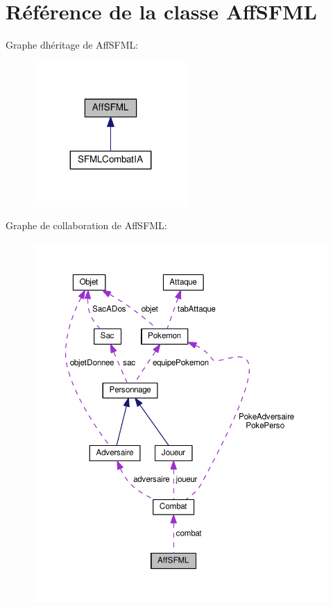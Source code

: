 \hypertarget{class_aff_s_f_m_l}{}\section{Référence de la classe Aff\+S\+F\+ML}
\label{class_aff_s_f_m_l}


Graphe d\textquotesingle{}héritage de Aff\+S\+F\+ML\+:\nopagebreak
\begin{figure}[H]
\begin{center}
\leavevmode
\includegraphics[width=167pt]{class_aff_s_f_m_l__inherit__graph}
\end{center}
\end{figure}


Graphe de collaboration de Aff\+S\+F\+ML\+:\nopagebreak
\begin{figure}[H]
\begin{center}
\leavevmode
\includegraphics[width=350pt]{class_aff_s_f_m_l__coll__graph}
\end{center}
\end{figure}
